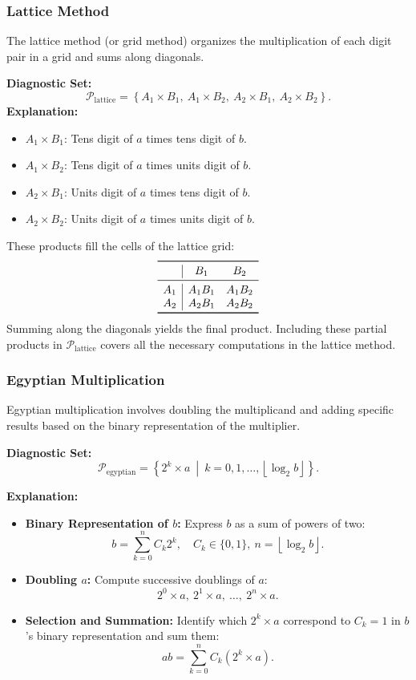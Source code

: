\documentclass[11pt]{article}
\begin{document}
\subsubsection{Lattice Method}
The lattice method (or grid method) organizes the multiplication of each digit pair in a grid and sums along diagonals.

\textbf{Diagnostic Set:}
\[
\mathcal{P}_{\text{lattice}} = \left\{ A_1 \times B_1,\ A_1 \times B_2,\ A_2 \times B_1,\ A_2 \times B_2 \right\}.
\]
\textbf{Explanation:}
\begin{itemize}
\item $A_1 \times B_1$: Tens digit of $a$ times tens digit of $b$.
\item $A_1 \times B_2$: Tens digit of $a$ times units digit of $b$.
\item $A_2 \times B_1$: Units digit of $a$ times tens digit of $b$.
\item $A_2 \times B_2$: Units digit of $a$ times units digit of $b$.
\end{itemize}
These products fill the cells of the lattice grid:
\[
\begin{array}{c|cc}
\toprule
& B_1 & B_2 \\
\midrule
A_1 & A_1B_1 & A_1B_2 \\
A_2 & A_2B_1 & A_2B_2 \\
\bottomrule
\end{array}
\]
Summing along the diagonals yields the final product. Including these partial products in $\mathcal{P}_{\text{lattice}}$ covers all the necessary computations in the lattice method.

\subsubsection{Egyptian Multiplication}

Egyptian multiplication involves doubling the multiplicand and adding specific results based on the binary representation of the multiplier.

\textbf{Diagnostic Set:}
\[
\mathcal{P}_{\text{egyptian}} = \left\{ 2^k \times a\ \middle|\ k = 0, 1, \dots, \left\lfloor \log_2 b \right\rfloor \right\}.
\]

\textbf{Explanation:}

\begin{itemize}
\item \textbf{Binary Representation of $b$:} Express $b$ as a sum of powers of two:
  \[
  b = \sum_{k=0}^{n} C_k 2^k,\quad C_k \in \{0,1\},\ n = \left\lfloor \log_2 b \right\rfloor.
  \]
  
\item \textbf{Doubling $a$:} Compute successive doublings of $a$:
  \[
  2^0 \times a,\ 2^1 \times a,\ \dots,\ 2^n \times a.
  \]
  
\item \textbf{Selection and Summation:} Identify which $2^k \times a$ correspond to $C_k = 1$ in $b$'s binary representation and sum them:
  \[
  ab = \sum_{k=0}^{n} C_k (2^k \times a).
  \]
\end{itemize}
\end{document}
